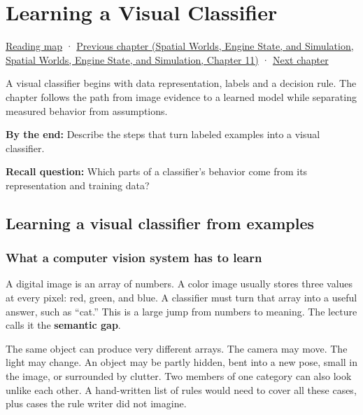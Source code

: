 \hypertarget{04-visual-computing-ii-ch031}{}
\chapter{Learning a Visual Classifier}\label{stagechapter:04-visual-computing-ii-ch031}\label{04-visual-computing-ii-ch031-learning-a-visual-classifier}

\hyperref[volume-reading-map]{Reading map} · \href{../05-Spatial-Worlds-Engine-State-and-Simulation/main.pdf\#nameddest=04-visual-computing-ii-ch030-mesh-operators-boundaries-and-diffusion}{Previous chapter (Spatial Worlds, Engine State, and Simulation, Spatial Worlds, Engine State, and Simulation, Chapter 11)} · \hyperref[04-visual-computing-ii-ch032-pose-estimation-and-robust-fitting]{Next chapter}

A visual classifier begins with data representation, labels and a decision rule. The chapter follows the path from image evidence to a learned model while separating measured behavior from assumptions.

\textbf{By the end:} Describe the steps that turn labeled examples into a visual classifier.

\textbf{Recall question:} Which parts of a classifier's behavior come from its representation and training data?

\section{Learning a visual classifier from examples}\label{04-visual-computing-ii-ch031-learning-a-visual-classifier-from-examples}

\subsection{What a computer vision system has to learn}\label{04-visual-computing-ii-ch031-what-a-computer-vision-system-has-to-learn}

A digital image is an array of numbers. A color image usually stores three values at every pixel: red, green, and blue. A classifier must turn that array into a useful answer, such as ``cat.'' This is a large jump from numbers to meaning. The lecture calls it the \textbf{semantic gap}.

The same object can produce very different arrays. The camera may move. The light may change. An object may be partly hidden, bent into a new pose, small in the image, or surrounded by clutter. Two members of one category can also look unlike each other. A hand-written list of rules would need to cover all these cases, plus cases the rule writer did not imagine.

